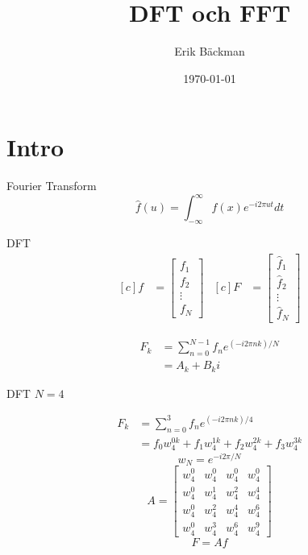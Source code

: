 \documentclass[presentation]{beamer}
\author{Erik Bäckman}
\date{\today}
\title{DFT och FFT}
\begin{document}
\maketitle
\section{Intro}
\label{sec:org48edd1e}

\begin{frame}[label={sec:orgd5b1e7f}]{Fourier Transform}
\[ \hat{f}(u) = \int_{-\infty}^{\infty} f(x)e^{-i2 \pi ut}dt \]
\end{frame}

\begin{frame}[label={sec:orgfce5d6f}]{DFT}
\begin{equation*}
\begin{aligned}[c]
f &=
  \begin{bmatrix}
    f_{1} \\
    f_{2} \\
    \vdots \\
    f_{N}
    \end{bmatrix}
\end{aligned}
\begin{aligned}[c]
F &=
  \begin{bmatrix}
    \hat{f}_{1} \\
    \hat{f}_{2} \\
    \vdots \\
    \hat{f}_{N}
    \end{bmatrix}
\end{aligned}
\end{equation*}

\begin{align*}
F_{k} &= \sum_{n=0}^{N-1} f_{n} e^{(-i2 \pi nk)/N} \\
      &= A_{k} + B_{k}i
\end{align*}
\end{frame}

\begin{frame}[label={sec:org8312b61}]{DFT}
\(N = 4\)

\begin{align*}
  F_{k} &= \sum_{n=0}^{3} f_{n} e^{(-i2 \pi nk)/4} \\
  &= f_{0}w_{4}^{0k} + f_{1}w_{4}^{1k} + f_{2}w_{4}^{2k} + f_{3}w_{4}^{3k}
\end{align*}
\begin{equation*}
w_{N} = e^{-i2 \pi/N}
\end{equation*}
\pause
\begin{equation*}
A =
\begin{bmatrix}
  w_{4}^{0} & w_{4}^{0} & w_{4}^{0} & w_{4}^{0} \\
  w_{4}^{0} & w_{4}^{1} & w_{4}^{2} & w_{4}^{4} \\
  w_{4}^{0} & w_{4}^{2} & w_{4}^{4} & w_{4}^{6} \\
  w_{4}^{0} & w_{4}^{3} & w_{4}^{6} & w_{4}^{9}
\end{bmatrix}
\end{equation*}
\begin{equation*}
F = Af
\end{equation*}
\end{frame}
\end{document}
